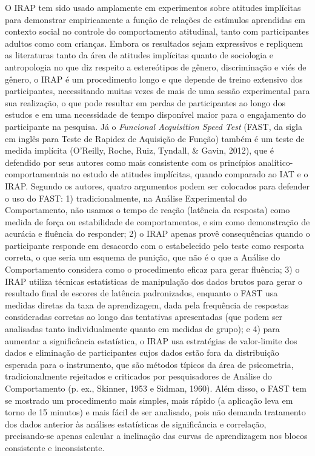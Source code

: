 O IRAP tem sido usado amplamente em experimentos sobre atitudes implícitas para demonstrar empiricamente a função de relações de estímulos aprendidas em contexto social no controle do comportamento atitudinal, tanto com participantes adultos como com crianças. Embora os resultados sejam expressivos e repliquem as literaturas tanto da área de atitudes implícitas quanto de sociologia e antropologia no que diz respeito a estereótipos de gênero, discriminação e viés de gênero, o IRAP é um procedimento longo e que depende de treino extensivo dos participantes, necessitando muitas vezes de mais de uma sessão experimental para sua realização, o que pode resultar em perdas de participantes ao longo dos estudos e em uma necessidade de tempo disponível maior para o engajamento do participante na pesquisa. Já o \textit{Funcional Acquisition Speed Test} (FAST, da sigla em inglês para Teste de Rapidez de Aquisição de Função) também é um teste de medida implícita (O'Reilly, Roche, Ruiz, Tyndall, \& Gavin, 2012), que é defendido por seus autores como mais consistente com os princípios analítico-comportamentais no estudo de atitudes implícitas, quando comparado ao IAT e o IRAP. Segundo os autores, quatro argumentos podem ser colocados para defender o uso do FAST: 1) tradicionalmente, na Análise Experimental do Comportamento, não usamos o tempo de reação (latência da resposta) como medida de força ou estabilidade de comportamentos, e sim como demonstração de acurácia e fluência do responder; 2) o IRAP apenas provê consequências quando o participante responde em desacordo com o estabelecido pelo teste como resposta correta, o que seria um esquema de punição, que não é o que a Análise do Comportamento considera como o procedimento eficaz para gerar fluência; 3) o IRAP utiliza técnicas estatísticas de manipulação dos dados brutos para gerar o resultado final de escores de latência padronizados, enquanto o FAST usa medidas diretas da taxa de aprendizagem, dada pela frequência de respostas consideradas corretas ao longo das tentativas apresentadas (que podem ser analisadas tanto individualmente quanto em medidas de grupo); e 4) para aumentar a significância estatística, o IRAP usa estratégias de valor-limite dos dados e eliminação de participantes cujos dados estão fora da distribuição esperada para o instrumento, que são métodos típicos da área de psicometria, tradicionalmente rejeitados e criticados por pesquisadores de Análise do Comportamento (p. ex., Skinner, 1953 e Sidman, 1960). Além disso, o FAST tem se mostrado um procedimento mais simples, mais rápido (a aplicação leva em torno de 15 minutos) e mais fácil de ser analisado, pois não demanda tratamento dos dados anterior às análises estatísticas de significância e correlação, precisando-se apenas calcular a inclinação das curvas de aprendizagem nos blocos consistente e inconsistente.


